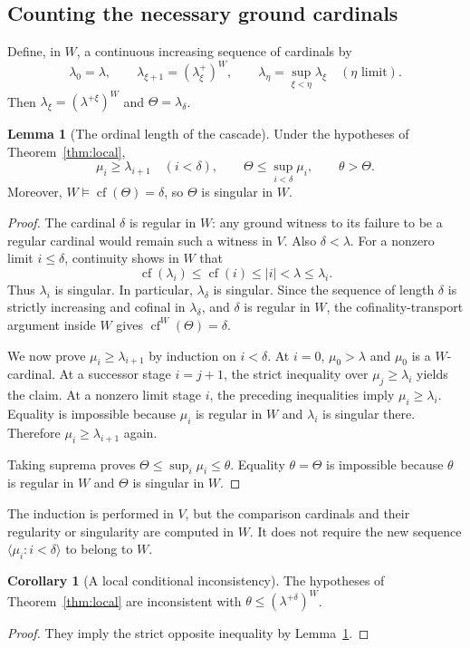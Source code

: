 \documentclass[11pt,letterpaper]{article}
\theoremstyle{definition}
\newtheorem{lemma}[definition]{Lemma}
\newtheorem{corollary}[definition]{Corollary}
\numberwithin{equation}{section}
\newcommand{\cf}{\operatorname{cf}}
\begin{document}
\subsection{Counting the necessary ground cardinals}

Define, in $W$, a continuous increasing sequence of cardinals by
\[
\lambda_0=\lambda,\qquad
\lambda_{\xi+1}=(\lambda_\xi^+)^W,\qquad
\lambda_\eta=\sup_{\xi<\eta}\lambda_\xi\quad(\eta\text{ limit}).
\]
Then $\lambda_\xi=(\lambda^{+\xi})^W$ and $\Theta=\lambda_\delta$.

\begin{lemma}[The ordinal length of the cascade]\label{lem:count}
Under the hypotheses of Theorem~\ref{thm:local},
\[
\mu_i\ge\lambda_{i+1}\quad(i<\delta),
\qquad\Theta\le\sup_{i<\delta}\mu_i,
\qquad\theta>\Theta.
\]
Moreover, $W\models\cf(\Theta)=\delta$, so $\Theta$ is singular in $W$.
\end{lemma}
\begin{proof}
The cardinal $\delta$ is regular in $W$: any ground witness to its failure to be a regular cardinal would remain such a witness in $V$. Also $\delta<\lambda$. For a nonzero limit $i\le\delta$, continuity shows in $W$ that
\[
\cf(\lambda_i)\le\cf(i)\le|i|<\lambda\le\lambda_i.
\]
Thus $\lambda_i$ is singular. In particular, $\lambda_\delta$ is singular. Since the sequence of length $\delta$ is strictly increasing and cofinal in $\lambda_\delta$, and $\delta$ is regular in $W$, the cofinality-transport argument inside $W$ gives $\cf^W(\Theta)=\delta$.

We now prove $\mu_i\ge\lambda_{i+1}$ by induction on $i<\delta$. At $i=0$, $\mu_0>\lambda$ and $\mu_0$ is a $W$-cardinal. At a successor stage $i=j+1$, the strict inequality over $\mu_j\ge\lambda_i$ yields the claim. At a nonzero limit stage $i$, the preceding inequalities imply $\mu_i\ge\lambda_i$. Equality is impossible because $\mu_i$ is regular in $W$ and $\lambda_i$ is singular there. Therefore $\mu_i\ge\lambda_{i+1}$ again.

Taking suprema proves $\Theta\le\sup_i\mu_i\le\theta$. Equality $\theta=\Theta$ is impossible because $\theta$ is regular in $W$ and $\Theta$ is singular in $W$.
\end{proof}

The induction is performed in $V$, but the comparison cardinals and their regularity or singularity are computed in $W$. It does not require the new sequence $\langle\mu_i:i<\delta\rangle$ to belong to $W$.

\begin{corollary}[A local conditional inconsistency]\label{cor:local}
The hypotheses of Theorem~\ref{thm:local} are inconsistent with
$\theta\le(\lambda^{+\delta})^W$.
\end{corollary}
\begin{proof}
They imply the strict opposite inequality by Lemma~\ref{lem:count}.
\end{proof}
\end{document}
